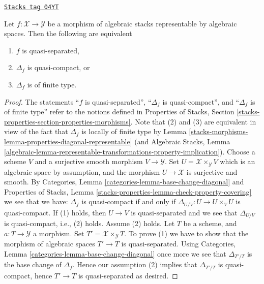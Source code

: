\begin{lemma}
\label{stacks-morphisms-lemma-representable-quasi-separated-diagonal-quasi-compact}
\href{https://stacks.math.columbia.edu/tag/04YT}{\texttt{Stacks tag 04YT}}

Let $f : \mathcal{X} \to \mathcal{Y}$ be a morphism of algebraic stacks
representable by algebraic spaces. Then the following are equivalent
\begin{enumerate}
\item $f$ is quasi-separated,
\item $\Delta_f$ is quasi-compact, or
\item $\Delta_f$ is of finite type.
\end{enumerate}
\end{lemma}

\begin{proof}
The statements
``$f$ is quasi-separated'',
``$\Delta_f$ is quasi-compact'', and
``$\Delta_f$ is of finite type''
refer to the notions defined in
Properties of Stacks,
Section \ref{stacks-properties-section-properties-morphisms}.
Note that (2) and (3) are equivalent in view of the fact that
$\Delta_f$ is locally of finite type by
Lemma \ref{stacks-morphisms-lemma-properties-diagonal-representable}
(and
Algebraic Stacks, Lemma
\ref{algebraic-lemma-representable-transformations-property-implication}).
Choose a scheme $V$ and a surjective smooth morphism $V \to \mathcal{Y}$.
Set $U = \mathcal{X} \times_\mathcal{Y} V$ which is an algebraic
space by assumption, and the morphism $U \to \mathcal{X}$ is surjective
and smooth. By
Categories, Lemma \ref{categories-lemma-base-change-diagonal}
and
Properties of Stacks,
Lemma \ref{stacks-properties-lemma-check-property-covering}
we see that we have: $\Delta_f$ is quasi-compact if and only if
$\Delta_{U/V} : U \to  U \times_V U$ is quasi-compact.
If (1) holds, then $U \to V$ is quasi-separated and we see that
$\Delta_{U/V}$ is quasi-compact, i.e., (2) holds.
Assume (2) holds. Let $T$ be a scheme, and $a : T \to \mathcal{Y}$
a morphism. Set $T' = \mathcal{X} \times_\mathcal{Y} T$. To prove
(1) we have to show that the morphism of algebraic spaces $T' \to T$
is quasi-separated. Using
Categories, Lemma \ref{categories-lemma-base-change-diagonal}
once more we see that $\Delta_{T'/T}$ is the base change of
$\Delta_f$. Hence our assumption (2) implies that $\Delta_{T'/T}$
is quasi-compact, hence $T' \to T$ is quasi-separated as desired.
\end{proof}

